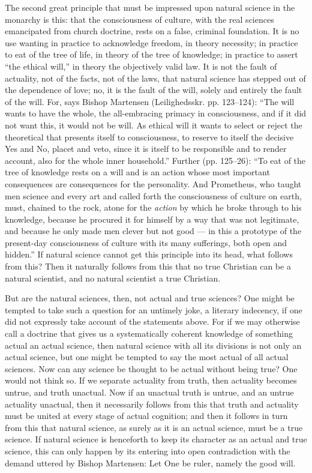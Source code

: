 \documentclass[12pt]{book}
\newcommand{\opage}[1]{\marginnote{\footnotesize\textit{[#1]}}}
\begin{document}
The second great principle that must be impressed upon natural science in the monarchy is this: that the consciousness of culture, with the real sciences emancipated from church doctrine, rests on a false, criminal foundation. It is no use wanting in practice to acknowledge freedom, in theory necessity; in practice to eat of the tree of life, in theory of the tree of knowledge; in practice to assert ``the ethical will,'' in theory the objectively valid law. It is not the fault of actuality, not of the facts, not of the laws, that natural science has stepped out of the dependence of love; no, it is the fault of the will, solely and entirely the fault of the will. For, says Bishop Martensen (Leilighedsskr. pp. 123--124): ``The will wants to have the whole, the all-embracing primacy in consciousness, and if it did not want this, it would not be will. As ethical will it wants to select or reject the theoretical that presents itself to consciousness, to reserve to itself the decisive Yes and No, placet and veto, since it is itself to be responsible and to render account, also for the whole inner household.'' Further (pp. 125--26): ``To eat of the tree of knowledge rests on a will and is an action whose most important consequences are consequences for the personality. And Prometheus, who taught men science and every art and called forth the consciousness of culture on earth, must, chained to the rock, atone for the \emph{action} by which he broke through to his knowledge, because he procured it for himself by a way that was not legitimate, and because he only made men clever but not good --- in this a prototype of the present-day consciousness of culture with its many sufferings, both open and hidden.''
\opage{11}\setcounter{footnote}{0}%
If natural science cannot get this principle into its head, what follows from this? Then it naturally follows from this that no true Christian can be a natural scientist, and no natural scientist a true Christian.

But are the natural sciences, then, not actual and true sciences? One might be tempted to take such a question for an untimely joke, a literary indecency, if one did not expressly take account of the statements above. For if we may otherwise call a doctrine that gives us a systematically coherent knowledge of something actual an actual science, then natural science with all its divisions is not only an actual science, but one might be tempted to say the most actual of all actual sciences. Now can any science be thought to be actual without being true? One would not think so. If we separate actuality from truth, then actuality becomes untrue, and truth unactual. Now if an unactual truth is untrue, and an untrue actuality unactual, then it necessarily follows from this that truth and actuality must be united at every stage of actual cognition; and then it follows in turn from this that natural science, as surely as it is an actual science, must be a true science. If natural science is henceforth to keep its character as an actual and true science, this can only happen by its entering into open contradiction with the demand uttered by Bishop Martensen: Let One be ruler, namely the good will.
\end{document}
